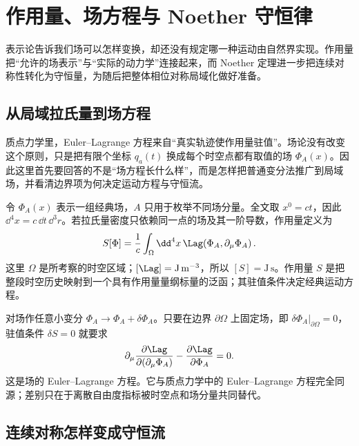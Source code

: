 
\section{作用量、场方程与 Noether 守恒律}\label{sec:action-noether-dp61}

表示论告诉我们场可以怎样变换，却还没有规定哪一种运动由自然界实现。作用量把“允许的场表示”与“实际的动力学”连接起来，而 Noether 定理进一步把连续对称性转化为守恒量，为随后把整体相位对称局域化做好准备。

\subsection{从局域拉氏量到场方程}

质点力学里，Euler--Lagrange 方程来自“真实轨迹使作用量驻值”。场论没有改变这个原则，只是把有限个坐标 \(q_a(t)\) 换成每个时空点都有取值的场 \(\Phi_A(x)\)。因此这里首先要回答的不是“场方程长什么样”，而是怎样把普通变分法推广到局域场，并看清边界项为何决定运动方程与守恒流。

令 $\Phi_A(x)$ 表示一组经典场，$A$ 只用于枚举不同场分量。全文取 $x^0=ct$，因此 $\dd^4 x=c\,\dd t\,\dd^3 r$。若拉氏量密度只依赖同一点的场及其一阶导数，作用量定义为
\begin{equation}
 {
 S[\Phi]=\frac1c\int_{\Omega}\dd^4 x\,
 \Lag\!\left(\Phi_A,\partial_\mu\Phi_A\right).}
 \label{eq:field-action-general-dp61}
\end{equation}
这里 $\Omega$ 是所考察的时空区域；$[\Lag]=\mathrm{J\,m^{-3}}$，所以 $[S]=\mathrm{J\,s}$。作用量 $S$ 是把整段时空历史映射到一个具有作用量量纲标量的泛函；其驻值条件决定经典运动方程。

对场作任意小变分 $\Phi_A\to\Phi_A+\delta\Phi_A$。只要在边界 $\partial\Omega$ 上固定场，即 $\delta\Phi_A|_{\partial\Omega}=0$，驻值条件 $\delta S=0$ 就要求
\begin{equation}
 {
 \partial_\mu\frac{\partial\Lag}{\partial(\partial_\mu\Phi_A)}
 -\frac{\partial\Lag}{\partial\Phi_A}=0.}
 \label{eq:field-euler-lagrange-dp61}
\end{equation}
这是场的 Euler--Lagrange 方程。它与质点力学中的 Euler--Lagrange 方程完全同源；差别只在于离散自由度指标被时空点和场分量共同替代。

\subsection{连续对称怎样变成守恒流}

